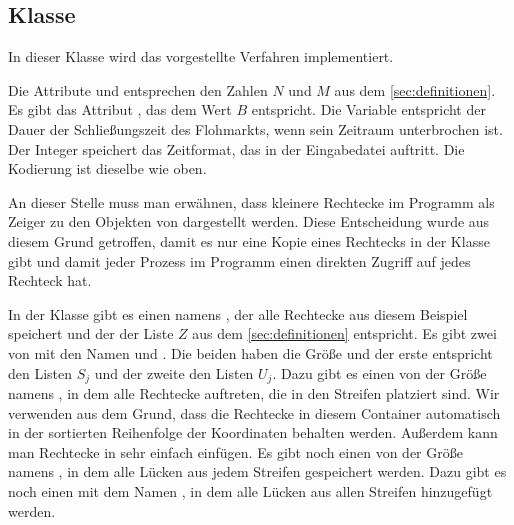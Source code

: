 \subsection{Klasse }
In dieser Klasse wird das vorgestellte Verfahren implementiert.

Die Attribute  und  entsprechen den Zahlen $N$ und $M$
aus dem \cref{sec:definitionen}. Es gibt das Attribut , das dem
Wert $B$ entspricht. Die Variable  entspricht der
Dauer der Schließungszeit des Flohmarkts, wenn sein Zeitraum unterbrochen ist.
Der Integer  speichert das Zeitformat, das in der Eingabedatei
auftritt. Die Kodierung ist dieselbe wie oben.

An dieser Stelle muss man erwähnen, dass kleinere Rechtecke im Programm als Zeiger zu 
den Objekten von  dargestellt werden.
Diese Entscheidung wurde aus diesem Grund getroffen, damit 
es nur eine Kopie eines Rechtecks in der Klasse  gibt und
damit jeder Prozess im Programm einen direkten Zugriff auf jedes Rechteck hat.

In der Klasse  gibt es einen  namens ,
der alle Rechtecke aus diesem Beispiel speichert und der der Liste $Z$
aus dem \cref{sec:definitionen} entspricht.
Es gibt zwei  von  mit den Namen 
 und . Die beiden 
haben die Größe  und der erste entspricht den Listen $S_j$ und
der zweite den Listen $U_j$.
Dazu gibt es einen  von  der Größe  namens ,
in dem alle Rechtecke auftreten, die in den Streifen platziert sind.
Wir verwenden  aus dem Grund, dass die Rechtecke in diesem Container 
automatisch in der sortierten Reihenfolge der Koordinaten  behalten werden.
Außerdem kann man Rechtecke in  sehr einfach einfügen.
Es gibt noch einen  von  der Größe  namens ,
in dem alle Lücken aus jedem Streifen gespeichert werden. 
Dazu gibt es noch einen  mit dem Namen , in dem alle Lücken
aus allen Streifen hinzugefügt werden.


